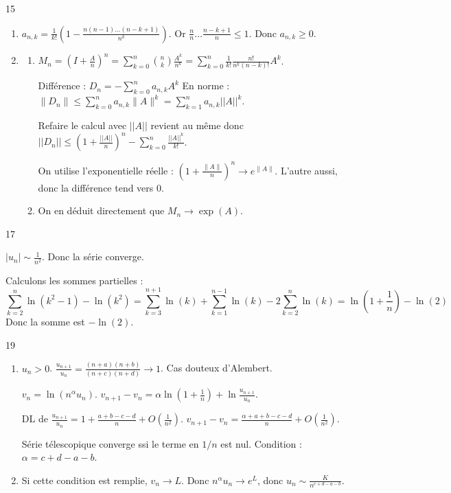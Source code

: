 \begin{correction}{15}
\begin{enumerate}
    \item $a_{n,k} = \frac{1}{k!} \left(1 - \frac{n(n-1)\dots(n-k+1)}{n^k} \right)$.
        Or $\frac{n}{n} \dots \frac{n-k+1}{n} \leqslant 1$. Donc $a_{n,k} \ge 0$.
    
    \item
    \begin{enumerate}   
        \item $\displaystyle M_n = \left(I + \frac A n \right)^n = \sum_{k=0}^n \binom{n}{k} \frac{A^k}{n^k} = \sum_{k=0}^n \frac{1}{k!} \frac{n!}{n^k(n-k)!} A^k$.

            Différence : $\displaystyle D_n = - \sum_{k=0}^n a_{n,k} A^k$
            En norme : $\displaystyle \|D_n\| \leqslant \sum_{k=0}^n a_{n,k} \|A\|^k = \sum_{k=1}^n a_{n,k} ||A||^k$.

            Refaire le calcul avec $||A||$ revient au même donc $\displaystyle||D_n|| \leqslant \left(1 + \frac {||A||} n\right)^n - \sum_{k=0}^n \frac {||A||^k} {k!}$.

            On utilise l'exponentielle réelle : $\left(1+\frac{\|A\|}{n}\right)^n \to e^{\|A\|}$.
            L'autre aussi, donc la différence tend vers 0.

        \item On en déduit directement que $M_n \to \exp(A)$.
    \end{enumerate}
\end{enumerate}
\end{correction}

\begin{correction}{17}

    $|u_n| \sim \frac 1 {n^2}$. Donc la série converge.

    Calculons les sommes partielles :
    $$\sum_{k=2}^n \ln(k^2 - 1) - \ln(k^2) = \sum_{k=3}^{n+1} \ln(k) + \sum_{k=1}^{n-1} \ln(k) - 2 \sum_{k=2}^{n} \ln(k) = \ln(1 + \frac 1 n) - \ln(2)$$
    Donc la somme est $-\ln(2)$.
\end{correction}

\begin{correction}{19}
\begin{enumerate}
    \item   
        $u_n > 0$. $\frac{u_{n+1}}{u_n} = \frac{(n+a)(n+b)}{(n+c)(n+d)} \to 1$. Cas douteux d'Alembert.

        $v_n = \ln(n^\alpha u_n)$.
        $v_{n+1}-v_n = \alpha \ln(1+\frac{1}{n}) + \ln \frac{u_{n+1}}{u_n}$.

        DL de $\frac{u_{n+1}}{u_n} = 1 + \frac{a+b-c-d}{n} + O\left(\frac{1}{n^2}\right)$.
        $v_{n+1}-v_n = \frac{\alpha + a+b-c-d}{n} + O\left(\frac{1}{n^2}\right)$.

        Série télescopique converge ssi le terme en $1/n$ est nul.
        Condition : $\alpha = c+d-a-b$.

    \item Si cette condition est remplie, $v_n \to L$.
        Donc $n^\alpha u_n \to e^L$,
        donc $u_n \sim \frac{K}{n^{c+d-a-b}}$.
\end{enumerate}
\end{correction}

